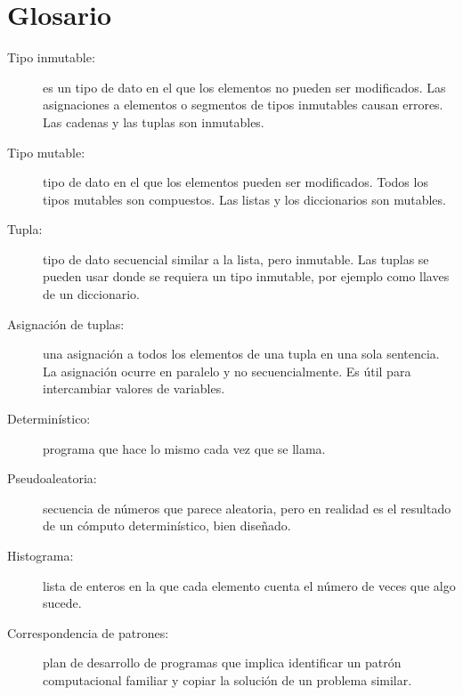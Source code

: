 
\section{Glosario}

\begin{description}

\item[Tipo inmutable:] es un tipo de dato en el que los elementos no
pueden ser modificados. Las asignaciones a elementos o segmentos
de tipos inmutables causan errores. Las cadenas y las tuplas son
inmutables.

\item[Tipo mutable:] tipo de dato en el que los elementos 
pueden ser modificados. Todos los tipos mutables son compuestos.
Las listas y los diccionarios son mutables.

\item[Tupla:] tipo de dato secuencial similar a la lista, pero 
inmutable.  Las tuplas se pueden usar donde se requiera un tipo inmutable,
por ejemplo como llaves de un diccionario.

\item[Asignación de tuplas:] una asignación a todos los elementos de una tupla
en una sola sentencia. La asignación ocurre en paralelo y no secuencialmente.
Es útil para intercambiar valores de variables.

\item[Determinístico:] programa que hace lo mismo cada vez que se llama.

\item[Pseudoaleatoria:] secuencia de números que parece aleatoria, pero
en realidad es el resultado de un cómputo determinístico, bien diseñado.

\item[Histograma:]  lista de enteros en la que cada elemento cuenta
el número de veces que algo sucede.

\item[Correspondencia de patrones:] plan de desarrollo de programas que
implica identificar un patrón computacional familiar y copiar la 
solución de un problema similar.


\end{description}

